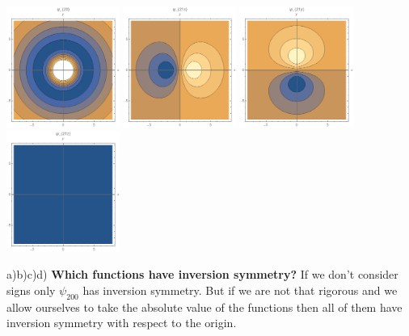 \begin{questions}
\begin{solution}
  \includegraphics[width=37mm]{cont_s.png}
  \includegraphics[width=37mm]{cont_px.png}
  \includegraphics[width=37mm]{cont_py.png}
  \includegraphics[width=37mm]{cont_pz.png}\label{fig:cont}

  \hspace{1.7cm}a)\hspace{35mm}b)\hspace{35mm}c)\hspace{35mm}d)
\vspace{0.5cm}
  \textbf{Which functions have inversion symmetry?}
  If we don't consider signs only $\psi_{200}$ has inversion symmetry. But if we are not that rigorous and we allow ourselves to take the absolute value of the functions then all of them have inversion symmetry with respect to the origin.
\end{solution}
\end{questions}


%
%
